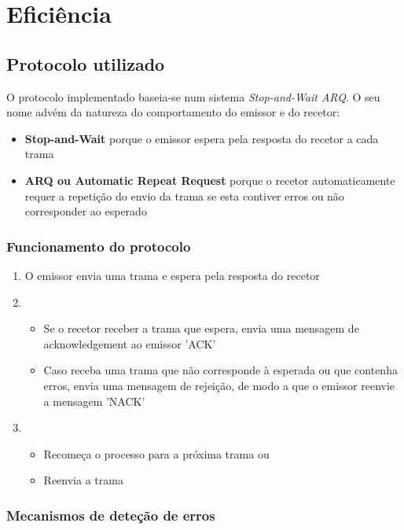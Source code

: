 \section{Eficiência}

\subsection{Protocolo utilizado}

O protocolo implementado baseia-se num sistema \textit{Stop-and-Wait ARQ}. O seu nome advém da natureza do comportamento do emissor e do recetor:
\begin{itemize}
    \item \textbf{Stop-and-Wait} porque o emissor espera pela resposta do recetor a cada trama
    \item \textbf{ARQ ou Automatic Repeat Request} porque o recetor automaticamente requer a repetição do envio da trama se esta contiver erros ou não corresponder ao esperado
\end{itemize}

\subsubsection{Funcionamento do protocolo}

\begin{enumerate}
    \item O emissor envia uma trama e espera pela resposta do recetor
    \item \begin{itemize}
        \item Se o recetor receber a trama que espera, envia uma mensagem de acknowledgement ao emissor 'ACK'
        \item Caso receba uma trama que não corresponde à esperada ou que contenha erros,  envia uma mensagem de rejeição, de modo a que o emissor reenvie a mensagem 'NACK'
    \end{itemize}
    \item \begin{itemize}
        \item Recomeça o processo para a próxima trama ou
        \item Reenvia a trama 
    \end{itemize}
\end{enumerate}

\subsubsection{Mecanismos de deteção de erros}

